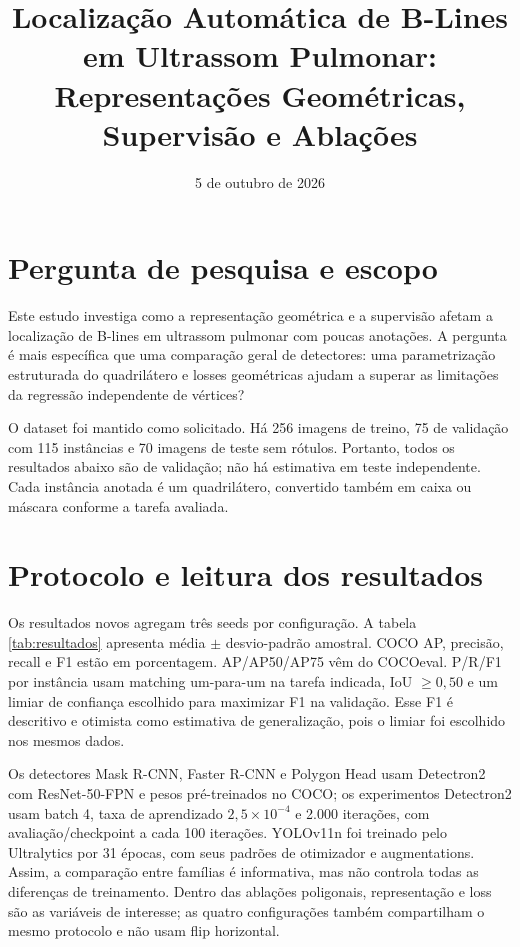 \documentclass[10pt]{article}
\title{Localização Automática de B-Lines em Ultrassom Pulmonar: \\
Representações Geométricas, Supervisão e Ablações}
\author{}
\date{5 de outubro de 2026}
\begin{document}
\maketitle

\section{Pergunta de pesquisa e escopo}

Este estudo investiga como a representação geométrica e a supervisão afetam a
localização de B-lines em ultrassom pulmonar com poucas anotações. A pergunta é
mais específica que uma comparação geral de detectores: uma parametrização
estruturada do quadrilátero e losses geométricas ajudam a superar as limitações
da regressão independente de vértices?

O dataset foi mantido como solicitado. Há 256 imagens de treino, 75 de validação
com 115 instâncias e 70 imagens de teste sem rótulos. Portanto, todos os
resultados abaixo são de validação; não há estimativa em teste independente.
Cada instância anotada é um quadrilátero, convertido também em caixa ou máscara
conforme a tarefa avaliada.

\section{Protocolo e leitura dos resultados}

Os resultados novos agregam três seeds por configuração. A tabela
\ref{tab:resultados} apresenta média $\pm$ desvio-padrão amostral. COCO AP,
precisão, recall e F1 estão em porcentagem. AP/AP50/AP75 vêm do COCOeval. P/R/F1
por instância usam matching um-para-um na tarefa indicada, IoU $\geq 0{,}50$ e
um limiar de confiança escolhido para maximizar F1 na validação. Esse F1 é
descritivo e otimista como estimativa de generalização, pois o limiar foi
escolhido nos mesmos dados.

Os detectores Mask R-CNN, Faster R-CNN e Polygon Head usam Detectron2 com
ResNet-50-FPN e pesos pré-treinados no COCO; os experimentos Detectron2 usam
batch 4, taxa de aprendizado $2{,}5\times10^{-4}$ e 2.000 iterações, com
avaliação/checkpoint a cada 100 iterações. YOLOv11n foi treinado pelo
Ultralytics por 31 épocas, com seus padrões de otimizador e augmentations.
Assim, a comparação entre famílias é informativa, mas não controla todas as
diferenças de treinamento. Dentro das ablações poligonais, representação e loss
são as variáveis de interesse; as quatro configurações também compartilham o
mesmo protocolo e não usam flip horizontal.
\end{document}
